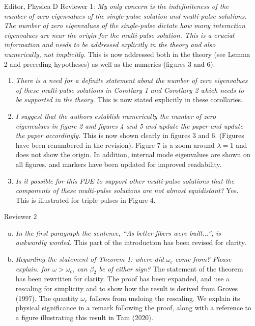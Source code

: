 \documentclass[11pt]{letter}
\begin{document}
\begin{letter}{Editor, Physica D}
Reviewer 1: \emph{My only concern is the indefiniteness of the number of zero eigenvalues of the single-pulse solution and multi-pulse solutions. The number of zero eigenvalues of the single-pulse dictate how many interaction eigenvalues are near the origin for the multi-pulse solution. This is a crucial information and needs to be addressed explicitly in the theory and also numerically, not implicitly.} This is now addressed both in the theory (see Lemma 2 and preceding hypotheses) as well as the numerics (figures 3 and 6).

\begin{enumerate}
\item \emph{There is a need for a definite statement about the number of zero eigenvalues of these multi-pulse solutions in Corollary 1 and Corollary 2 which needs to be supported in the theory.} This is now stated explicitly in these corollaries. 
\vspace{4mm}

\item \emph{I suggest that the authors establish numerically the number of zero eigenvalues in figure 2 and figures 4 and 5 and update the paper and update the paper accordingly.}
\vspace{4mm} This is now shown clearly in figures 3 and 6. (Figures have been renumbered in the revision). Figure 7 is a zoom around $\lambda = 1$ and does not show the origin. In addition, internal mode eigenvalues are shown on all figures, and markers have been updated for improved readability.

\item \emph{Is it possible for this PDE to support other multi-pulse solutions that the components of these multi-pulse solutions are not almost equidistant?} Yes. This is illustrated for triple pulses in Figure 4.
\vspace{4mm}
\end{enumerate}

Reviewer 2
\begin{enumerate}[(a)]
\item \emph{In the first paragraph the sentence, ``As better fibers were built...'', is awkwardly worded.} This part of the introduction has been revised for clarity.
\vspace{4mm}

\item \emph{Regarding the statement of Theorem 1: where did $\omega_c$ come from? Please explain.
for $\omega > \omega_c$, can $\beta_2$ be of either sign?} The statement of the theorem has been rewritten for clarity. The proof has been expanded, and use a rescaling for simplicity and to show how the result is derived from Groves (1997). The quantity $\omega_c$ follows from undoing the rescaling. We explain its physical significance in a remark following the proof, along with a reference to a figure illustrating this result in Tam (2020).
\vspace{4mm}


\end{enumerate}
\end{letter}
\end{document}
